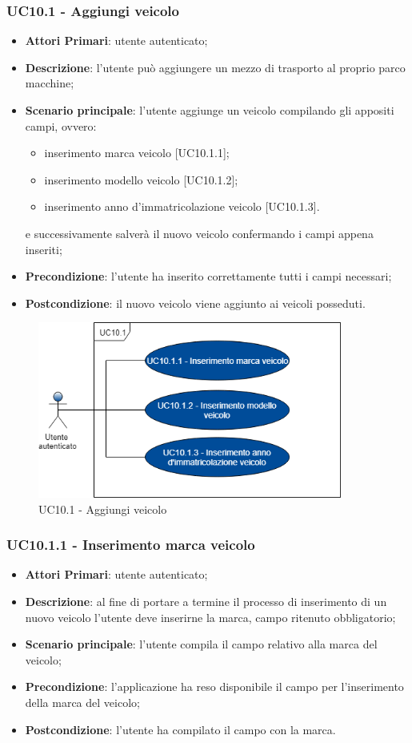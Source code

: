  \subsubsection{UC10.1 - Aggiungi veicolo}
 \begin{itemize}
 	\item \textbf{Attori Primari}: utente autenticato;
 	\item \textbf{Descrizione}: l'utente può aggiungere un mezzo di trasporto al proprio parco macchine;
 	\item \textbf{Scenario principale}: l'utente aggiunge un veicolo compilando gli appositi campi, ovvero:
 	\begin{itemize}
 		\item inserimento marca veicolo [UC10.1.1];
 		\item inserimento modello veicolo [UC10.1.2];
 		\item inserimento anno d'immatricolazione veicolo [UC10.1.3].
 	\end{itemize}
 	e successivamente salverà il nuovo veicolo confermando i campi appena inseriti;
 	\item \textbf{Precondizione}: l'utente ha inserito correttamente tutti i campi necessari;
 	\item \textbf{Postcondizione}: il nuovo veicolo viene aggiunto ai veicoli posseduti.
 \end{itemize}
\begin{figure}[H]
	\includegraphics[width=10cm]{res/images/UC10-1Aggiungiveicolo.png}
	\centering
	\caption{UC10.1 - Aggiungi veicolo}
\end{figure}
\subsubsection{UC10.1.1 - Inserimento marca veicolo}
\begin{itemize}
	\item \textbf{Attori Primari}: utente autenticato;
	\item \textbf{Descrizione}: al fine di portare a termine il processo di inserimento di un nuovo veicolo l'utente deve inserirne la marca, campo ritenuto obbligatorio;
	\item \textbf{Scenario principale}: l'utente compila il campo relativo alla marca del veicolo;	
	\item \textbf{Precondizione}: l'applicazione ha reso disponibile il campo per l'inserimento della marca del veicolo;
	\item \textbf{Postcondizione}: l'utente ha compilato il campo con la marca.	
\end{itemize}

